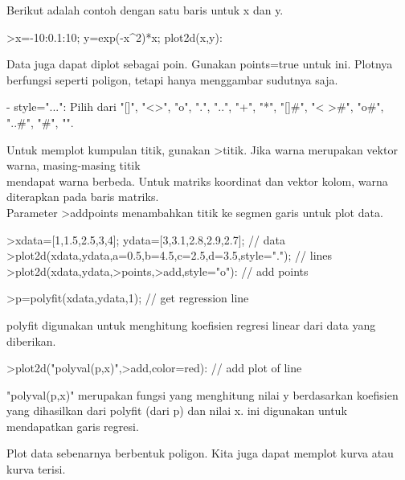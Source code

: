 \documentclass{article}
\begin{document}
\begin{eulernotebook}
\begin{eulercomment}
\begin{eulercomment}
\begin{eulercomment}
\begin{eulercomment}
\begin{eulercomment}
\begin{eulercomment}
\begin{eulercomment}
\begin{eulercomment}
\begin{eulercomment}
\begin{eulercomment}
\begin{eulercomment}
Berikut adalah contoh dengan satu baris untuk x dan y.
\end{eulercomment}
\begin{eulerprompt}
>x=-10:0.1:10; y=exp(-x^2)*x; plot2d(x,y):
\end{eulerprompt}
\begin{eulercomment}
Data juga dapat diplot sebagai poin. Gunakan points=true untuk ini.
Plotnya berfungsi seperti poligon, tetapi hanya menggambar sudutnya
saja.

- style="...": Pilih dari "[]", "\textless{}\textgreater{}", "o", ".", "..", "+", "*", "[]#",
"\textless{} \textgreater{}#", "o#", "..#", "#", "\textbar{}".

Untuk memplot kumpulan titik, gunakan \textgreater{}titik. Jika warna merupakan
vektor warna, masing-masing titik\\
mendapat warna berbeda. Untuk matriks koordinat dan vektor kolom,
warna diterapkan pada baris matriks.\\
Parameter \textgreater{}addpoints menambahkan titik ke segmen garis untuk plot
data.
\end{eulercomment}
\begin{eulerprompt}
>xdata=[1,1.5,2.5,3,4]; ydata=[3,3.1,2.8,2.9,2.7]; // data
>plot2d(xdata,ydata,a=0.5,b=4.5,c=2.5,d=3.5,style="."); // lines
>plot2d(xdata,ydata,>points,>add,style="o"): // add points
\end{eulerprompt}
\begin{eulerprompt}
>p=polyfit(xdata,ydata,1); // get regression line
\end{eulerprompt}
\begin{eulercomment}
polyfit digunakan untuk menghitung koefisien regresi linear dari data
yang diberikan.
\end{eulercomment}
\begin{eulerprompt}
>plot2d("polyval(p,x)",>add,color=red): // add plot of line
\end{eulerprompt}
\begin{eulercomment}
"polyval(p,x)" merupakan fungsi yang menghitung nilai y berdasarkan
koefisien yang dihasilkan dari polyfit (dari p) dan nilai x. ini
digunakan untuk mendapatkan garis regresi.

\begin{eulercomment}
\begin{eulercomment}
Plot data sebenarnya berbentuk poligon. Kita juga dapat memplot kurva
atau kurva terisi.


\end{eulercomment}
\end{eulercomment}
\end{eulercomment}
\end{eulercomment}
\end{eulercomment}
\end{eulercomment}
\end{eulercomment}
\end{eulercomment}
\end{eulercomment}
\end{eulercomment}
\end{eulercomment}
\end{eulercomment}
\end{eulercomment}
\end{eulernotebook}
\end{document}

